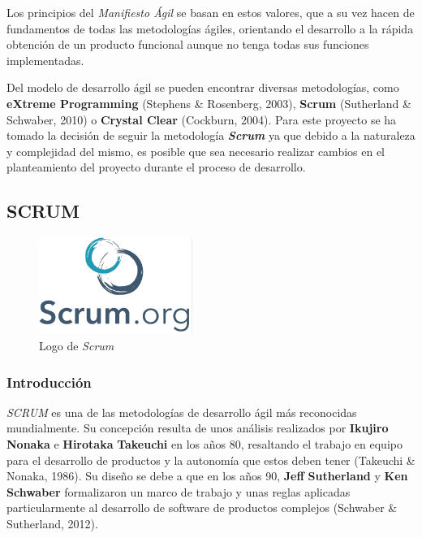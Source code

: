 Los principios del \textit{Manifiesto Ágil} se basan en estos valores, que a su vez hacen de fundamentos de 
todas las metodologías ágiles, orientando el desarrollo a la rápida obtención de un producto funcional 
aunque no tenga todas sus funciones implementadas. \medskip

Del modelo de desarrollo ágil se pueden encontrar diversas metodologías, como \textbf{eXtreme Programming} (Stephens \& Rosenberg, 2003),
\textbf{Scrum} (Sutherland \& Schwaber, 2010) o \textbf{Crystal Clear} (Cockburn, 2004). 
Para este proyecto se ha tomado la decisión de seguir la metodología \textit{\textbf{Scrum}} ya que debido a la naturaleza y complejidad del mismo, 
es posible que sea necesario realizar cambios en el planteamiento del proyecto durante el proceso de desarrollo. \medskip

\subsection{SCRUM}
\begin{figure}[H]
    \centering
    \includegraphics[width=5cm]{Images/Logo_Scrum.jpeg}
    \caption{Logo de \textit{Scrum}}
\end{figure}

\subsubsection{Introducción}
\textit{SCRUM} es una de las metodologías de desarrollo ágil más reconocidas mundialmente. Su concepción resulta de unos 
análisis realizados por \textbf{Ikujiro} \textbf{Nonaka} e \textbf{Hirotaka} \textbf{Takeuchi} en los años 80, resaltando el trabajo en equipo para el 
desarrollo de productos y la autonomía que estos deben tener (Takeuchi \& Nonaka, 1986). Su diseño se debe a que 
en los años 90, \textbf{Jeff} \textbf{Sutherland} y \textbf{Ken} \textbf{Schwaber} formalizaron un marco de trabajo y unas reglas aplicadas 
particularmente al desarrollo de software de productos complejos (Schwaber \& Sutherland, 2012). \medskip %

